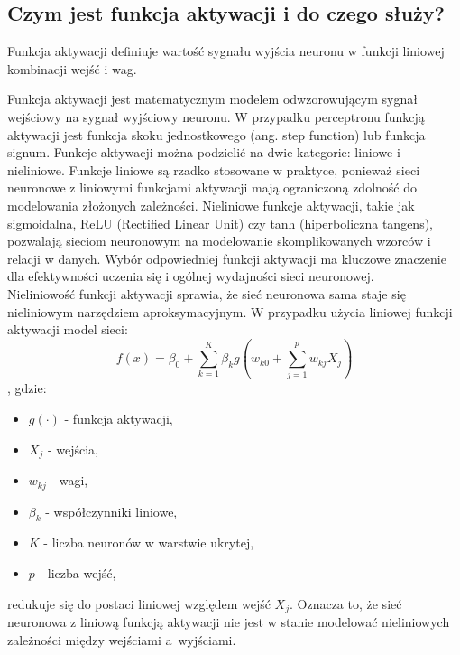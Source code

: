 \subsection{Czym jest funkcja aktywacji i do czego służy?}
Funkcja aktywacji definiuje wartość sygnału wyjścia neuronu w funkcji liniowej kombinacji wejść i wag.

Funkcja aktywacji jest matematycznym modelem odwzorowującym sygnał wejściowy na sygnał wyjściowy neuronu. W przypadku perceptronu funkcją aktywacji jest funkcja skoku jednostkowego (ang. step function) lub funkcja signum. Funkcje aktywacji można podzielić na dwie kategorie: liniowe i nieliniowe. Funkcje liniowe są rzadko stosowane w praktyce, ponieważ sieci neuronowe z liniowymi funkcjami aktywacji mają ograniczoną zdolność do modelowania złożonych zależności. Nieliniowe funkcje aktywacji, takie jak sigmoidalna, ReLU (Rectified Linear Unit) czy tanh (hiperboliczna tangens), pozwalają sieciom neuronowym na modelowanie skomplikowanych wzorców i relacji w danych. Wybór odpowiedniej funkcji aktywacji ma kluczowe znaczenie dla efektywności uczenia się i ogólnej wydajności sieci neuronowej.\\

Nieliniowość funkcji aktywacji sprawia, że sieć neuronowa sama staje się nieliniowym narzędziem aproksymacyjnym. W przypadku użycia liniowej funkcji aktywacji model sieci: 
\[f(x)= \beta_0 +\sum_{k=1}^{K}{\beta_k g(w_{k0}+\sum_{j=1}^{p}{w_{kj}X_j})}\],
gdzie: 
\begin{itemize}
    \item $g(\cdot)$ - funkcja aktywacji,
    \item $X_j$ - wejścia,
    \item $w_{kj}$ - wagi,
    \item $\beta_k$ - współczynniki liniowe,
    \item $K$ - liczba neuronów w warstwie ukrytej,
    \item $p$ - liczba wejść,
\end{itemize}
redukuje się do postaci liniowej względem wejść $X_j$. Oznacza to, że sieć neuronowa z liniową funkcją aktywacji nie jest w stanie modelować nieliniowych zależności między wejściami a~wyjściami.\cite{islp}

